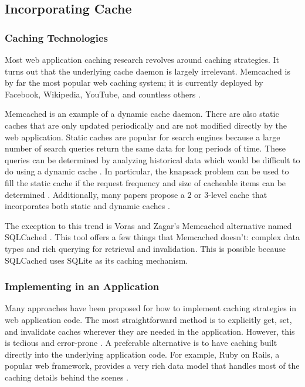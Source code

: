 \documentclass[12pt]{ucthesis}
\begin{document}
\subsection{Incorporating Cache}
\subsubsection{Caching Technologies}
Most web application caching research revolves around caching strategies.
It turns out that the underlying cache daemon is largely irrelevant.
{\textsf Memcached} is by far the most popular web caching system; it is currently deployed by Facebook, Wikipedia, YouTube, and countless others \cite{memcachedDotOrg}.

{\textsf Memcached} is an example of a dynamic cache daemon.
There are also static caches that are only updated periodically and are not modified directly by the web application.
Static caches are popular for search engines because a large number of search queries return the same data for long periods of time.
These queries can be determined by analyzing historical data which would be difficult to do using a dynamic cache \cite{designTradeOffsSearchEngine}.
In particular, the knapsack problem can be used to fill the static cache if the request frequency and size of cacheable items can be determined \cite{designTradeOffsSearchEngine}.
Additionally, many papers propose a 2 or 3-level cache that incorporates both static and dynamic caches \cite{cacheAdmissionPolicies, designTradeOffsSearchEngine}.

The exception to this trend is Voras and Zagar's {\textsf Memcached} alternative named SQLCached \cite{sqlCached}.
This tool offers a few things that {\textsf Memcached} doesn't: complex data types and rich querying for retrieval and invalidation.
This is possible because SQLCached uses SQLite as its caching mechanism.

\subsubsection{Implementing in an Application}
Many approaches have been proposed for how to implement caching strategies in web application code.
The most straightforward method is to explicitly get, set, and invalidate caches wherever they are needed in the application.
However, this is tedious and error-prone \cite{keyBasedCacheExpiration, triggerBasedORM}.
A preferable alternative is to have caching built directly into the underlying application code.
For example, Ruby on Rails, a popular web framework, provides a very rich data model that handles most of the caching details behind the scenes \cite{keyBasedCacheExpiration}.
\end{document}
